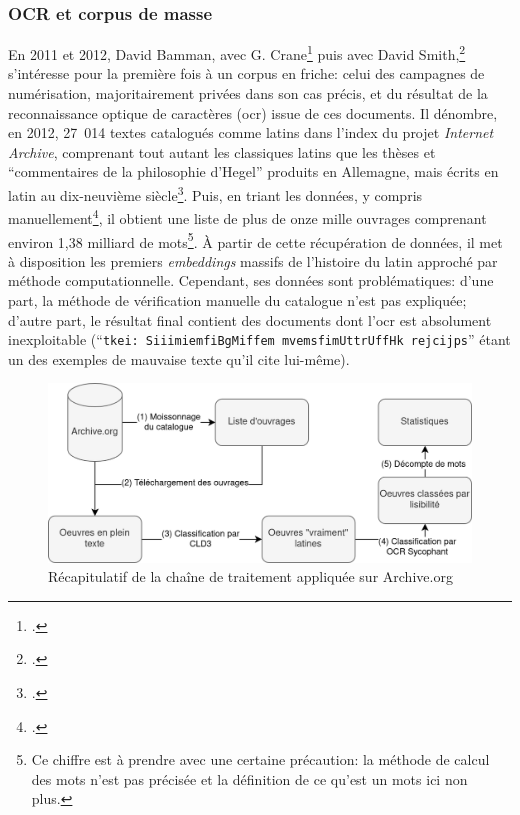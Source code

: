 \subsubsection{OCR et corpus de masse}

En 2011 et 2012, David Bamman, avec G. Crane\footcite{Bamman:2011:MHW:1998076.1998078} puis avec David Smith,\footcite{bamman_extracting_2012} s'intéresse pour la première fois à un corpus en friche: celui des campagnes de numérisation, majoritairement privées dans son cas précis, et du résultat de la reconnaissance optique de caractères (\acrshort{ocr}) issue de ces documents. Il dénombre, en 2012, 27~014 textes catalogués comme latins dans l'index du projet \textit{Internet Archive}, comprenant tout autant les classiques latins que les thèses et ``commentaires de la philosophie d'Hegel'' produits en Allemagne, mais écrits en latin au dix-neuvième siècle\footcite{bamman_extracting_2012}. Puis, en triant les données, y compris manuellement\footcite{bamman_dbammanlatintexts_2018}, il obtient une liste de plus de onze mille ouvrages comprenant environ 1,38 milliard de mots\footnote{Ce chiffre est à prendre avec une certaine précaution: la méthode de calcul des mots n'est pas précisée et la définition de ce qu'est un mots ici non plus.}. À partir de cette récupération de données, il met à disposition les premiers \textit{embeddings} massifs de l'histoire du latin approché par méthode computationnelle. Cependant, ses données sont problématiques: d'une part, la méthode de vérification manuelle du catalogue n'est pas expliquée; d'autre part, le résultat final contient des documents dont l'\acrshort{ocr} est absolument inexploitable (``\texttt{tkei: SiiimiemfiBgMiffem mvemsfimUttrUffHk rejcijps}'' étant un des exemples de mauvaise texte qu'il cite lui-même).

\begin{figure}
    \centering
    \includegraphics[width=.8\linewidth]{figures/ocrSycophant.png}
    \caption{Récapitulatif de la chaîne de traitement appliquée sur Archive.org}
    \label{fig:chap1:workflow-sycophant}
\end{figure}


